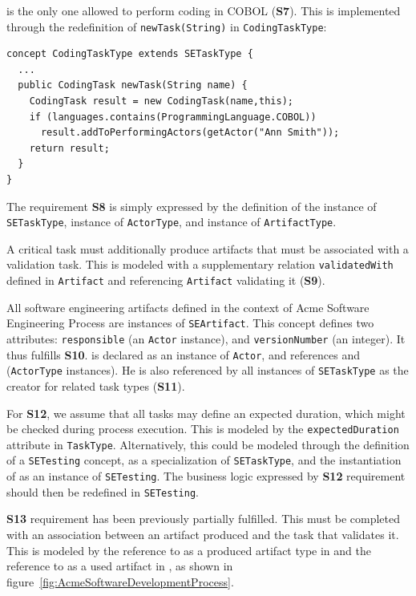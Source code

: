  is the only one allowed to perform coding in COBOL (\textbf{S7}). This is implemented through the redefinition of \texttt{newTask(String)} in \texttt{CodingTaskType}:

\begin{lstlisting}
concept CodingTaskType extends SETaskType {
  ...
  public CodingTask newTask(String name) {
    CodingTask result = new CodingTask(name,this);
    if (languages.contains(ProgrammingLanguage.COBOL))
      result.addToPerformingActors(getActor("Ann Smith"));
    return result;
  }
}
\end{lstlisting}

The requirement \textbf{S8} is simply expressed by the definition of the  instance of \texttt{SETaskType},  instance of \texttt{ActorType}, and  instance of \texttt{ArtifactType}.

A critical task must additionally produce artifacts that must be associated with a validation task. This is modeled with a supplementary relation \texttt{validatedWith} defined in \texttt{Artifact} and referencing \texttt{Artifact} validating it (\textbf{S9}).

All software engineering artifacts defined in the context of Acme Software Engineering Process are  instances of \texttt{SEArtifact}. This concept defines two attributes: \texttt{responsible} (an \texttt{Actor} instance), and \texttt{versionNumber} (an integer). It thus fulfills \textbf{S10}.  is declared as an instance of \texttt{Actor}, and references  and  (\texttt{ActorType} instances). He is also referenced by all instances of \texttt{SETaskType} as the creator for related task types (\textbf{S11}).


For \textbf{S12}, we assume that all tasks may define an expected duration, which might be checked during process execution. This is modeled by the \texttt{expectedDuration} attribute in \texttt{TaskType}. Alternatively, this could be modeled through the definition of a \texttt{SETesting} concept, as a specialization of \texttt{SETaskType}, and the instantiation of  as an instance of \texttt{SETesting}. The business logic expressed by \textbf{S12} requirement should then be redefined in \texttt{SETesting}.

\textbf{S13} requirement has been previously partially fulfilled. This must be completed with an association between an artifact produced and the task that validates it. This is modeled by the reference to  as a produced artifact type in  and the reference to  as a used artifact in , as shown in figure~\ref{fig:AcmeSoftwareDevelopmentProcess}.


